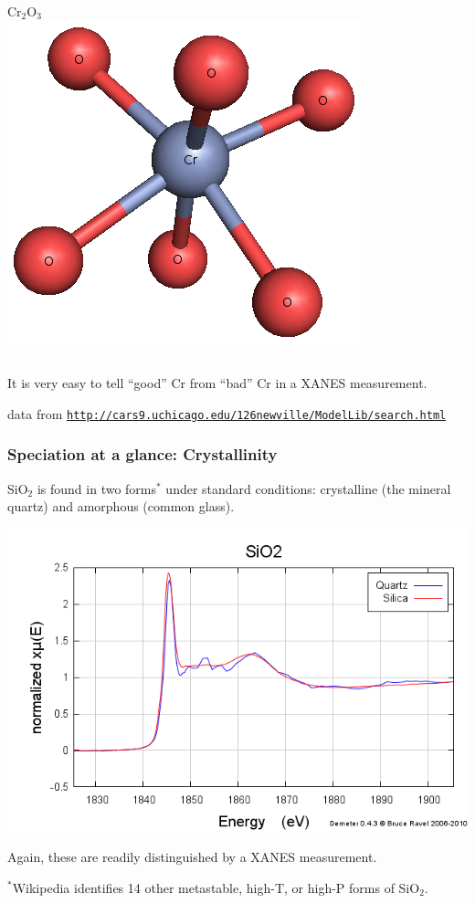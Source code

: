 \documentclass[10pt, xcolor=x11names, compress]{beamer}
\begin{document}
\begin{frame}
\begin{columns}
\begin{column}{0.3\linewidth}
\begin{center}
        {\color{Red2}Cr$_2$O$_3$}\\
        \includegraphics[width=0.5\linewidth]{images/Cr/Cr2O3.png}
      \end{center}
    \end{column}
  \end{columns}

  \smallskip

  It is very easy to tell ``good'' Cr from ``bad'' Cr in a XANES
  measurement.

  \begin{bottomnote}[0.6][20] 
    data from 
    \href{http://cars9.uchicago.edu/~newville/ModelLib/search.html}
    {\color{LightBlue4}{\ComputerMouse~}\texttt{http://cars9.uchicago.edu/\char126newville/ModelLib/search.html}}
  \end{bottomnote}
\end{frame}

\begin{frame}
  \frametitle{Speciation at a glance: Crystallinity}

  SiO$_2$ is found in two forms$^\ast$ under standard conditions:
  {\color{Blue3}crystalline (the mineral quartz)} and {\color{Red2}amorphous
  (common glass)}.

  \begin{center}
    \includegraphics[width=0.7\linewidth]{images/SiO2.png}
  \end{center}

  Again, these are readily distinguished by a XANES measurement.

  \begin{bottomnote}[0.55][20]
    $^\ast$Wikipedia identifies 14 other metastable, high-T,
    or high-P forms of SiO$_2$.
  \end{bottomnote}
\end{frame}
\end{document}
